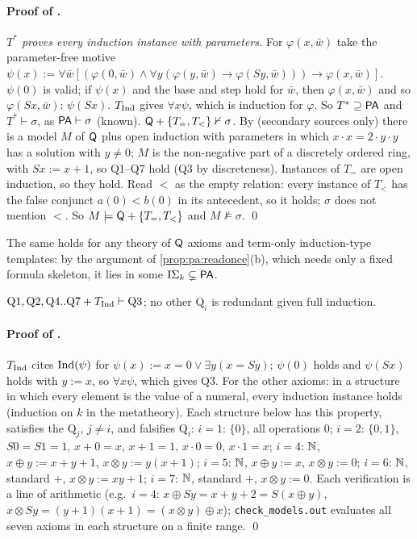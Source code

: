\paragraph{Proof of .} \emph{$T^*$ proves every induction instance with parameters.} For $\varphi(x,\bar w)$ take the parameter-free motive $\psi(x):=\forall\bar w[(\varphi(0,\bar w)\wedge\forall y(\varphi(y,\bar w)\to\varphi(Sy,\bar w)))\to\varphi(x,\bar w)]$. $\psi(0)$ is valid; if $\psi(x)$ and the base and step hold for $\bar w$, then $\varphi(x,\bar w)$ and so $\varphi(Sx,\bar w)$: $\psi(Sx)$. $T_{\mathrm{Ind}}$ gives $\forall x\psi$, which is induction for $\varphi$. So $T^*\supseteq\mathsf{PA}$ and $T^*\vdash\sigma$, as $\mathsf{PA}\vdash\sigma$ (known). \emph{$\mathsf{Q}+\{T_=,T_<\}\nvdash\sigma$.} By \citet{shepherdson1964nonstandard} (secondary sources only) there is a model $M$ of $\mathsf{Q}$ plus open induction with parameters in which $x\cdot x=2\cdot y\cdot y$ has a solution with $y\ne0$; $M$ is the non-negative part of a discretely ordered ring, with $Sx:=x+1$, so Q1--Q7 hold (Q3 by discreteness). Instances of $T_=$ are open induction, so they hold. Read $<$ as the empty relation: every instance of $T_<$ has the false conjunct $a(0)<b(0)$ in its antecedent, so it holds; $\sigma$ does not mention $<$. So $M\models\mathsf{Q}+\{T_=,T_<\}$ and $M\not\models\sigma$. \qed

The same holds for any theory of $\mathsf{Q}$ axioms and term-only induction-type templates: by the argument of \cref{prop:pa:readonce}(b), which needs only a fixed formula skeleton, it lies in some $\mathrm{I}\Sigma_{k}\subsetneq\mathsf{PA}$.

\begin{proposition}\pabrk{}\label{prop:pa:redundant}
$\mathrm{Q1},\mathrm{Q2},\mathrm{Q4..Q7}+T_{\mathrm{Ind}}\vdash\mathrm{Q3}$; no other $\mathrm{Q}_i$ is redundant given full induction.
\end{proposition}

\paragraph{Proof of .} $T_{\mathrm{Ind}}$ cites $\mathrm{Ind}(\psi)$ for $\psi(x):=x=0\vee\exists y(x=Sy)$; $\psi(0)$ holds and $\psi(Sx)$ holds with $y:=x$, so $\forall x\psi$, which gives Q3. For the other axioms: in a structure in which every element is the value of a numeral, every induction instance holds (induction on $k$ in the metatheory). Each structure below has this property, satisfies the $\mathrm Q_j$, $j\ne i$, and falsifies $\mathrm Q_i$: $i=1$: $\{0\}$, all operations $0$; $i=2$: $\{0,1\}$, $S0=S1=1$, $x+0=x$, $x+1=1$, $x\cdot0=0$, $x\cdot1=x$; $i=4$: $\mathbb{N}$, $x\oplus y:=x+y+1$, $x\otimes y:=y(x+1)$; $i=5$: $\mathbb{N}$, $x\oplus y:=x$, $x\otimes y:=0$; $i=6$: $\mathbb{N}$, standard $+$, $x\otimes y:=xy+1$; $i=7$: $\mathbb{N}$, standard $+$, $x\otimes y:=0$. Each verification is a line of arithmetic (e.g.\ $i=4$: $x\oplus Sy=x+y+2=S(x\oplus y)$, $x\otimes Sy=(y+1)(x+1)=(x\otimes y)\oplus x$); \texttt{check\_models.out} evaluates all seven axioms in each structure on a finite range. \qed

